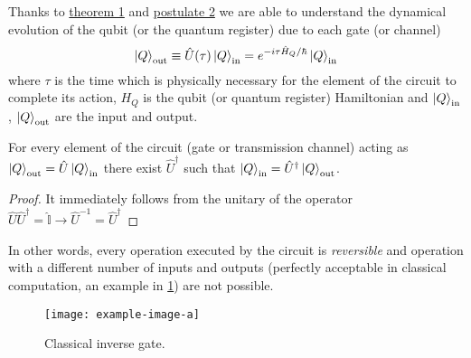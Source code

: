 Thanks to \hyperref[theorem:1]{theorem 1} and \hyperref[postulate:2]{postulate 2} we are able to understand the dynamical evolution of the qubit (or the quantum register) due to each gate (or channel) 
\begin{equation}\label{eq:evolution}
     \ket{Q}_\textup{out} \equiv \hat{U}(\tau) \ket{Q}_\textup{in} = e^{-i\tau\hat{H}_Q/\hbar} \ket{Q}_\textup{in}
\end{equation}
where $\tau$ is the time which is physically necessary for the element of the circuit to complete its action, $H_Q$ is the qubit (or quantum register) Hamiltonian and $\ket{Q}_\textup{in}$, $\ket{Q}_\textup{out}$ are the input and output.
\begin{theorem}
For every element of the circuit (gate or transmission channel) acting as $\ket{Q}_\textup{out} = \hat{U} \ket{Q}_\textup{in}$ there exist $\hat{U}^\dagger$ such that $\ket{Q}_\textup{in} = \hat{U}^\dagger \ket{Q}_\textup{out}$.
\end{theorem}
\begin{proof}
It immediately follows from the unitary of the operator $\hat{U} \hat{U}^\dagger = \hat{\mathbb{I}} \rightarrow \hat{U}^{-1} = \hat{U}^\dagger$
\end{proof}
In other words, every operation executed by the circuit is \emph{reversible} and operation with a different number of inputs and outputs (perfectly acceptable in classical computation, an example in \ref{fig:classical-inverse-gate}) are not possible.
\begin{figure}[htb]
\centering
\texttt{[image: example-image-a]}
\caption{Classical inverse gate.}
\label{fig:classical-inverse-gate}
\end{figure}
